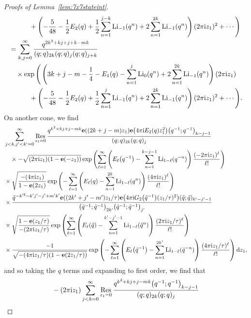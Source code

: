 \documentclass[pdftex]{sigma}
\numberwithin{equation}{section}
\def\tq{\tilde{q}}
\def\Res{\mathrm{Res}}
\def\Li{\mathrm{Li}}
\def\e{\mathbf e}
\def\tq{\tilde{q}}
\def\Res{\mathrm{Res}}
\def\Li{\operatorname{Li}}
\begin{document}
\begin{proof}[Proofs of Lemma~\ref{lem:7x7stateint}]
\begin{align}
 &\quad\qquad+\left(-\frac{5}{48}-\frac{1}{2}E_2(q)+\frac{1}{2}\sum_{n=1}^{j-k}\Li_{-1}(q^{n})+2\sum_{n=1}^{2k}\Li_{-1}(q^{n})\right)(2\pi {\rm i}z_{1})^2+\cdots\Bigg)\nonumber\\
 & =
 \sum_{k,j=0}^{\infty}\frac{q^{2k^2+kj+j+k-mk}}{(q;q)_{2k}(q;q)_{j}(q;q)_{j+k}}\nonumber\\
 &\quad\times\exp\Bigg(\left(3k+j-m-\frac{1}{4}-E_{1}(q)-\sum_{n=1}^{j}\Li_{0}(q^{n})+2\sum_{n=1}^{2k}\Li_{-1}(q^{n})\right)(2\pi {\rm i}z_{1})\nonumber\\
 &\quad\qquad +\left(-\frac{5}{48}-\frac{1}{2}E_2(q)+\frac{1}{2}\sum_{n=1}^{j}\Li_{-1}(q^{n})+2\sum_{n=1}^{2k}\Li_{-1}(q^{n})\right)(2\pi {\rm i}z_{1})^2+\cdots\Bigg).\label{eq:exp.tech.ap.2}
\end{align}
On another cone, we find
\begin{align*}
 &\sum_{j<k,j'<k'=0}^{\infty}\mathop{\Res}\limits_{z_1=0}\frac{q^{k^2+kj+j-mk}\e((2k+j-m)z_{1})\e\bigl(4\pi {\rm i} E_2(q)z_1^2\bigr)\bigl(q^{-1};q^{-1}\bigr)_{k-j-1}}{(q;q)_{2k}(q;q)_{j}}\\
 &\quad\times-\sqrt{(2\pi {\rm i}z_1)(1-\e(-z_1))}\exp\left(\sum_{\ell=1}^{\infty}\left(E_{\ell}\bigl(q^{-1}\bigr)-\sum_{n=1}^{k-j-1}\Li_{1-\ell}(q^{-n})\right)\frac{(-2\pi {\rm i}z_1)^\ell}{\ell!}\right)\\
 & \times\sqrt{\frac{-(4\pi {\rm i}z_1)}{1-\e(2z_1)}}\exp\left(-\sum_{\ell=1}^{\infty}\left(E_{\ell}(q)-\sum_{n=1}^{2k}\Li_{1-\ell}(q^{n})\right)\frac{(4\pi {\rm i} z_1)^\ell}{\ell!}\right)\\
 & \times\frac{\tq^{-k'^2-k'j'-j'+m'k'}\e((2k'+j'-m')z_1/\tau)\e\bigl(4\pi {\rm i} G_2\bigl(\tq^{-1}\bigr)(z_1/\tau)^2\bigr)(\tq;\tq)_{k'-j'-1}}{\bigl(\tq^{-1};\tq^{-1}\bigr)_{2k'}\bigl(\tq^{-1};\tq^{-1}\bigr)_{j'}}\\
 & \times\sqrt{\frac{1-\e(z_1/\tau)}{-(2\pi {\rm i}z_1/\tau)}}\exp\left(\sum_{\ell=1}^{\infty}\left(E_{\ell}(\tq)-\sum_{n=1}^{k'-j'-1}\Li_{1-\ell}(\tq^{n})\right)\frac{(2\pi {\rm i}z_1/\tau)^\ell}{\ell!}\right)\\
 & \times\frac{-1}{\sqrt{-(4\pi {\rm i}z_1/\tau)(1-\e(2z_1/\tau))}}\exp\left(-\sum_{\ell=1}^{\infty}\left(E_{\ell}\bigl(\tq^{-1}\bigr)-\sum_{n=1}^{2k'}\Li_{1-\ell}(\tq^{-n})\right)\frac{(4\pi {\rm i} z_1/\tau)^{\ell}}{\ell!}\right){\rm d}z_1,
\end{align*}
and so taking the $q$ terms and expanding to first order, we find that
\begin{align}
 &-(2\pi {\rm i}z_1)\sum_{j<k=0}^{\infty}\mathop{\Res}\limits_{z_1=0}\frac{q^{k^2+kj+j-mk}\bigl(q^{-1};q^{-1}\bigr)_{k-j-1}}{(q;q)_{2k}(q;q)_{j}}\label{eq:exp.tech.ap.3}\\

\end{align}
\end{proof}
\end{document}
